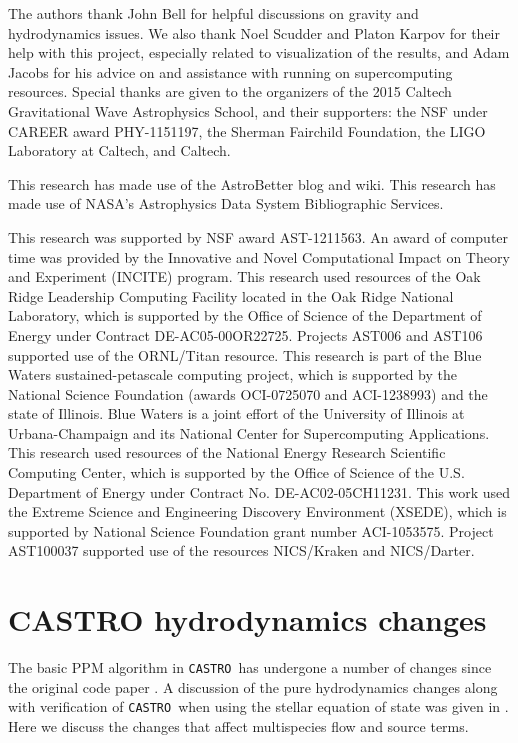 \documentclass[iop]{../emulateapj}
\newcommand{\castro}{\texttt{CASTRO}}
\begin{document}
The authors thank John Bell for helpful discussions on gravity 
and hydrodynamics issues. We also thank Noel Scudder and Platon Karpov 
for their help with this project, especially related to visualization of the results, 
and Adam Jacobs for his advice on and assistance with 
running on supercomputing resources. Special thanks are given 
to the organizers of the 2015 Caltech Gravitational Wave 
Astrophysics School, and their supporters: the NSF 
under CAREER award PHY-1151197, the Sherman Fairchild 
Foundation, the LIGO Laboratory at Caltech, and Caltech.

This research has made use of the AstroBetter blog and wiki. 
This research has made use of NASA's Astrophysics Data System 
Bibliographic Services.

This research was supported by NSF award AST-1211563. An
award of computer time was provided by the Innovative and Novel
Computational Impact on Theory and Experiment (INCITE) program.  This
research used resources of the Oak Ridge Leadership Computing Facility
located in the Oak Ridge National Laboratory, which is supported by
the Office of Science of the Department of Energy under Contract
DE-AC05-00OR22725. Projects AST006 and AST106 supported use of the ORNL/Titan resource. 
This research is part of the Blue Waters sustained-petascale computing project, 
which is supported by the National Science Foundation (awards OCI-0725070 
and ACI-1238993) and the state of Illinois. Blue Waters is a joint 
effort of the University of Illinois at Urbana-Champaign and its 
National Center for Supercomputing Applications.
This research used resources of the National Energy Research Scientific Computing
Center, which is supported by the Office of Science of the
U.S. Department of Energy under Contract No. DE-AC02-05CH11231.  
This work used the Extreme Science and Engineering Discovery Environment (XSEDE), 
which is supported by National Science Foundation grant number ACI-1053575. 
Project AST100037 supported use of the resources NICS/Kraken and NICS/Darter.

\clearpage

\appendix

\section{CASTRO hydrodynamics changes}
\label{app:hydro}

The basic PPM algorithm in \castro\ has undergone a number of changes
since the original code paper \citep{castro}.  A discussion of the
pure hydrodynamics changes along with verification of \castro\ when
using the stellar equation of state was given in
\citet{zingalekatz:2015}.  Here we discuss the changes that affect
multispecies flow and source terms.
\end{document}
